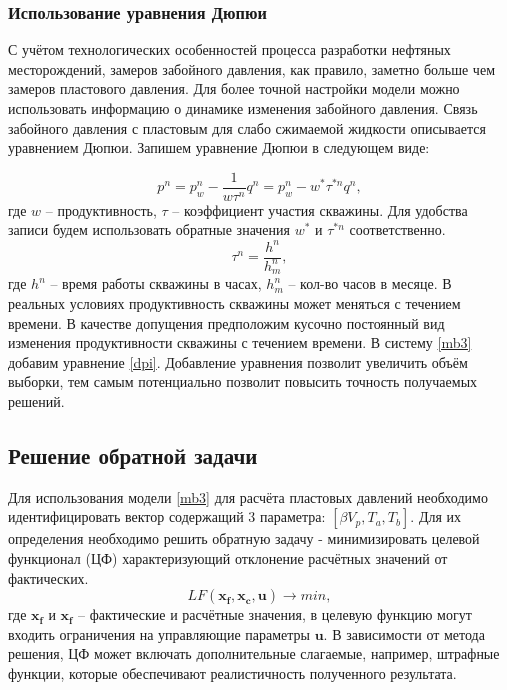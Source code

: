 \documentclass[14pt]{article}
\begin{document}
\subsubsection{Использование уравнения Дюпюи}
С учётом технологических особенностей процесса разработки нефтяных месторождений, замеров забойного давления, как правило, заметно больше чем замеров пластового давления. Для более точной настройки модели можно использовать информацию о динамике изменения забойного давления. Связь забойного давления с пластовым для слабо сжимаемой жидкости описывается уравнением Дюпюи. Запишем уравнение Дюпюи в следующем виде:

\begin{equation}\label{dpi}
	p^n = p_w^n - \frac{1}{w \tau^n}q^n = p_w^n - w^* \tau^{*n} q^n, 
\end{equation}
где $w$ -- продуктивность, $\tau$ -- коэффициент участия скважины. Для удобства записи будем использовать обратные значения $w^*$ и $\tau^{*n}$ соответственно.
\begin{equation*}
	\tau^n = \frac{h^n}{h^n_m},
\end{equation*}
где $h^n$ -- время работы скважины в часах, $h^n_m$ -- кол-во часов в месяце.
В реальных условиях продуктивность скважины может меняться с течением времени. В качестве допущения предположим кусочно постоянный вид изменения продуктивности скважины с течением времени. В систему \ref{mb3} добавим уравнение \ref{dpi}. Добавление уравнения позволит увеличить объём выборки, тем самым потенциально позволит повысить точность получаемых решений.

\subsection{Решение обратной задачи} 
Для использования модели \ref{mb3} для расчёта пластовых давлений необходимо идентифицировать вектор содержащий 3 параметра: $[\beta V_p, T_a, T_b]$. Для их определения необходимо решить обратную задачу - минимизировать целевой функционал (ЦФ) характеризующий отклонение расчётных значений от фактических.
\begin{equation}\label{lf_min}
	LF(\boldsymbol{x_f}, \boldsymbol{x_c}, \boldsymbol{u})  \rightarrow min,
\end{equation}
где $\boldsymbol{x_f}$ и $\boldsymbol{x_f}$ -- фактические и расчётные значения, в целевую функцию могут входить ограничения на управляющие параметры $\boldsymbol{u}$.
 В зависимости от метода решения, ЦФ может включать дополнительные слагаемые, например, штрафные функции, которые обеспечивают реалистичность полученного результата. 
 
\end{document}
